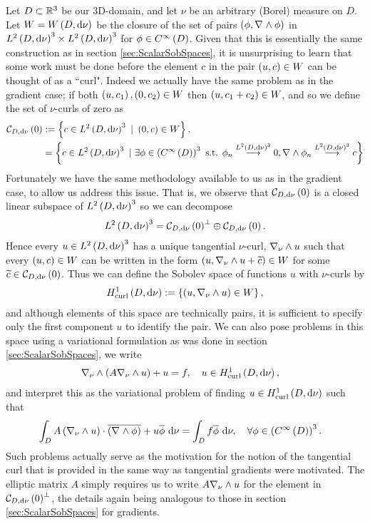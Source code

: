 Let $D\subset\mathbb{R}^3$ be our 3D-domain, and let $\nu$ be an arbitrary (Borel) measure on $D$.
Let $W=W\left( D,\mathrm{d}\nu \right)$ be the closure of the set of pairs $\left( \phi, \nabla_{}\wedge\phi \right)$ in $L^{2}\left( D,\mathrm{d}\nu \right)^3\times L^{2}\left( D,\mathrm{d}\nu \right)^3$ for $\phi\in C^{\infty}\left( D \right)$.
Given that this is essentially the same construction as in section \ref{sec:ScalarSobSpaces}, it is unsurprising to learn that some work must be done before the element $c$ in the pair $\left( u,c \right)\in W$ can be thought of as a ``curl".
Indeed we actually have the same problem as in the gradient case; if both $\left( u,c_1 \right), \left( 0, c_2 \right)\in W$ then $\left( u,c_1+c_2 \right)\in W$, and so we define the set of $\nu$-curls of zero as
\begin{align*}
	\curlZero{D}{\nu} &:= \clbracs{ c\in\ltwo{D}{\nu}^3 \ \vert \ \bracs{0,c}\in W }, \\
	&= \clbracs{ c\in\ltwo{D}{\nu}^3 \ \vert \ \exists\phi\in\bracs{\smooth{D}}^3 \text{ s.t. } \phi_n\lconv{\ltwo{D}{\nu}^3}0, \curl{}\phi_n\lconv{\ltwo{D}{\nu}^3}c }
\end{align*}
Fortunately we have the same methodology available to us as in the gradient case, to allow us address this issue.
That is, we observe that $\mathcal{C}_{ D, \mathrm{d}\nu}\left( 0 \right)$ is a closed linear subspace of $L^{2}\left( D,\mathrm{d}\nu \right)^3$ so we can decompose
\begin{align*}
	L^{2}\left( D,\mathrm{d}\nu \right)^3 = \mathcal{C}_{ D, \mathrm{d}\nu}\left( 0 \right)^\perp \oplus \mathcal{C}_{ D, \mathrm{d}\nu}\left( 0 \right).
\end{align*}
Hence every $u\in L^{2}\left( D,\mathrm{d}\nu \right)^3$ has a unique tangential $\nu$-curl, $\nabla_{\nu}\wedge u$ such that every $\left( u,c \right)\in W$ can be written in the form $\left( u, \nabla_{\nu}\wedge u + \widetilde{c} \right)\in W$ for some $\widetilde{c}\in\mathcal{C}_{ D, \mathrm{d}\nu}\left( 0 \right)$.
Thus we can define the Sobolev space of functions $u$ with $\nu$-curls by
\begin{align*}
	H^1_\mathrm{curl}\left( D, \mathrm{d}\nu \right) := \left\{  \left( u,\nabla_{\nu}\wedge u \right)\in W  \right\},
\end{align*}
and although elements of this space are technically pairs, it is sufficient to specify only the first component $u$ to identify the pair.
We can also pose problems in this space using a variational formulation as was done in section \ref{sec:ScalarSobSpaces}, we write
\begin{align*}
	\nabla_{\nu}\wedge\left( A\nabla_{\nu}\wedge u \right) + u &= f, \quad u\in H^1_\mathrm{curl}\left( D, \mathrm{d}\nu \right),
\end{align*}
and interpret this as the variational problem of finding $u\in H^1_\mathrm{curl}\left( D, \mathrm{d}\nu \right)$ such that
\begin{align*}
	\int_{D} A\left( \nabla_{\nu}\wedge u \right)\cdot\overline{\left( \nabla_{}\wedge\phi \right)} + u\overline{\phi} \ \mathrm{d}\nu &= \int_{D} f\overline{\phi}  \ \mathrm{d}\nu, \quad \forall\phi\in\left( C^{\infty}\left( D \right) \right)^3.
\end{align*}
Such problems actually serve as the motivation for the notion of the tangential curl that is provided in the same way as tangential gradients were motivated.
The elliptic matrix $A$ simply requires us to write $A\nabla_{\nu}\wedge u$ for the element in $\mathcal{C}_{ D, \mathrm{d}\nu}\left( 0 \right)^\perp$, the details again being analogous to those in section \ref{sec:ScalarSobSpaces} for gradients. \newline

